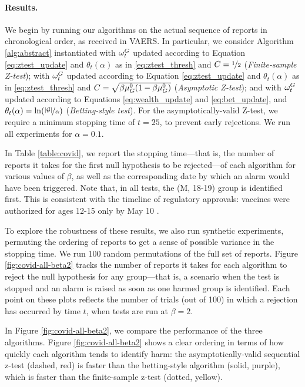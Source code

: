 \paragraph{Results.}  
We begin by running our algorithms on the actual sequence of reports in chronological order, as received in VAERS. In particular, we consider Algorithm \ref{alg:abstract} instantiated with $\omega_t^G$ updated according to Equation \eqref{eq:ztest_update} and $\theta_t(\alpha)$ as in \eqref{eq:ztest_thresh} and $C = \nicefrac12$ (\textit{Finite-sample Z-test}); with $\omega_t^G$ updated according to Equation \eqref{eq:ztest_update} and $\theta_t(\alpha)$ as in \eqref{eq:ztest_thresh} and $C = \sqrt{\beta{\mu_G^0}(1 - \beta{\mu_G^0})}$ (\textit{Asymptotic Z-test}); and with $\omega_t^G$ updated according to Equations \eqref{eq:wealth_update} and \eqref{eq:bet_update}, and $\theta_t(\alpha) = \ln (\nicefrac{|{\mathcal{G}}|}{\alpha})$ 
(\textit{Betting-style test}). 
For the asymptotically-valid Z-test, we require a minimum stopping time of $t = 25$, to prevent early rejections.
We run all experiments for $\alpha = 0.1$. 

In Table \ref{table:covid}, we report the stopping time---that is, the number of reports it takes for the first null hypothesis to be rejected---of each algorithm for various values of $\beta$, as well as the corresponding date by which an alarm would have been triggered. Note that, in all tests, the (M, 18-19) group is identified first. This is consistent with the timeline of regulatory approvals: vaccines were authorized for ages 12-15 only by May 10 \citep{lovelace2021fda}.

To explore the robustness of these results, we also run synthetic experiments, 
permuting the ordering of reports to get a sense of possible variance in the stopping time. We run 100 random permutations of the full set of reports. 
Figure \ref{fig:covid-all-beta2} tracks the number of reports it takes for each algorithm to reject the null hypothesis for any group---that is, a scenario when the test is stopped and an alarm is raised as soon as one harmed group is identified. Each point on these plots reflects the number of trials (out of 100) in which a rejection has occurred by time $t$, when tests are run at $\beta=2$. 

In Figure \ref{fig:covid-all-beta2}, we compare the performance of the three algorithms.\iftoggle{icml}{\footnote{To interpret the figure, by time $t=100$, the asymptotically-valid z-test had stopped (identified harm) in all 100 permutations; the betting-style test stopped in around 80 permutations; and the finite-sample z-test stopped in around 20 permutations.}}{ To interpret the figure, by time $t=100$, the asymptotically-valid z-test had already identified harm in all 100 permutations; the betting-style test identified harm in around 80 permutations; and the finite-sample z-test had only identified harm in around 20 permutations.}
Figure \ref{fig:covid-all-beta2} shows a clear ordering in terms of how quickly each algorithm tends to identify harm: the asymptotically-valid sequential z-test (dashed, red) is faster than the betting-style algorithm (solid, purple), which is faster than the finite-sample z-test (dotted, yellow). 

